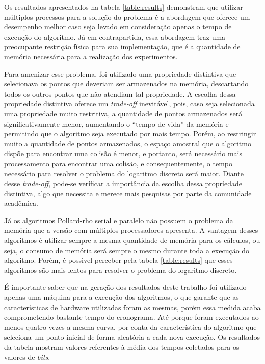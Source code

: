 Os resultados apresentados na tabela \ref{table:results} demonstram que utilizar múltiplos processos para a solução do problema é a abordagem que oferece um desempenho melhor caso seja levado em consideração apenas o tempo de execução do algoritmo. Já em contrapartida, essa abordagem traz uma preocupante restrição física para sua implementação, que é a quantidade de memória necessária para a realização dos experimentos.

Para amenizar esse problema, foi utilizado uma propriedade distintiva que selecionava os pontos que deveriam ser armazenados na memória, descartando todos os outros pontos que não atendiam tal propriedade. A escolha dessa propriedade distintiva oferece um \textit{trade-off} inevitável, pois, caso seja selecionada uma propriedade muito restritiva, a quantidade de pontos armazenados será significativamente menor, aumentando o ``tempo de vida'' da memória e permitindo que o algoritmo seja executado por mais tempo. Porém, ao restringir muito a quantidade de pontos armazenados, o espaço amostral que o algoritmo dispõe para encontrar uma colisão é menor, e portanto, será necessário mais processamento para encontrar uma colisão, e consequentemente, o tempo necessário para resolver o problema do logaritmo discreto será maior. Diante desse \textit{trade-off}, pode-se verificar a importância da escolha dessa propriedade distintiva, algo que necessita e merece mais pesquisas por parte da comunidade acadêmica.

Já os algoritmos Pollard-rho serial e paralelo não possuem o problema da memória que a versão com múltiplos processadores apresenta. A vantagem desses algoritmos é utilizar sempre a mesma quantidade de memória para os cálculos, ou seja, o consumo de memória será sempre o mesmo durante toda a execução do algoritmo. Porém, é possivel perceber pela tabela \ref{table:results} que esses algoritmos são mais lentos para resolver o problema do logaritmo discreto.

É importante saber que na geração dos resultados deste trabalho foi utilizado apenas uma máquina para a execução dos algoritmos, o que garante que as características de hardware utilizadas foram as mesmas, porém essa medida acaba comprometendo bastante tempo do cronograma. Até porque foram executados ao menos quatro vezes a mesma curva, por conta da característica do algoritmo que seleciona um ponto inicial de forma aleatória a cada nova execução. Os resultados da tabela mostram valores referentes à média dos tempos coletados para os valores de \textit{bits}.
